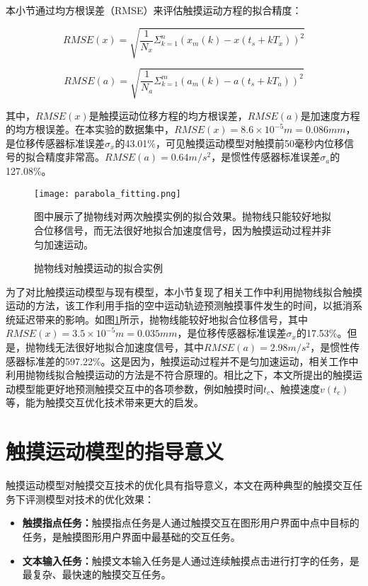 本小节通过均方根误差（RMSE）来评估触摸运动方程的拟合精度：

\begin{equation}
	RMSE(x)
	=\sqrt{\frac{1}{N_x}\Sigma^n_{k=1}{\left(x_m(k)-x(t_s+k T_x)\right)^2}}
\end{equation}

\begin{equation}
	RMSE(a)
	=\sqrt{\frac{1}{N_a}\Sigma^m_{k=1}{\left(a_m(k)-a(t_s+k T_a)\right)^2}}
\end{equation}

其中，$RMSE(x)$是触摸运动位移方程的均方根误差，$RMSE(a)$是加速度方程的均方根误差。在本实验的数据集中，$RMSE(x)=8.6\times10^{-5}m=0.086mm$，是位移传感器标准误差$\sigma_x$的43.01\%，可见触摸运动模型对触摸前50毫秒内位移信号的拟合精度非常高。$RMSE(a)=0.64m/s^2$，是惯性传感器标准误差$\sigma_a$的127.08\%。

\begin{figure}
	\centering
	\texttt{[image: parabola\_fitting.png]}
	\caption*{图中展示了抛物线对两次触摸实例的拟合效果。抛物线只能较好地拟合位移信号，而无法很好地拟合加速度信号，因为触摸运动过程并非匀加速运动。}
	\caption{抛物线对触摸运动的拟合实例}
	\label{fig:parabola_fitting}
\end{figure}

为了对比触摸运动模型与现有模型，本小节复现了相关工作中\cite{xia2014zero}利用抛物线拟合触摸运动的方法，该工作利用手指的空中运动轨迹预测触摸事件发生的时间，以抵消系统延迟带来的影响。如图\ref{fig:parabola_fitting}所示，抛物线能较好地拟合位移信号，其中$RMSE(x)=3.5\times10^{-5}m=0.035mm$，是位移传感器标准误差$\sigma_x$的17.53\%。但是，抛物线无法很好地拟合加速度信号，其中$RMSE(a)=2.98m/s^2$，是惯性传感器标准差的597.22\%。这是因为，触摸运动过程并不是匀加速运动，相关工作中利用抛物线拟合触摸运动的方法是不符合原理的。相比之下，本文所提出的触摸运动模型能更好地预测触摸交互中的各项参数，例如触摸时间$t_c$、触摸速度$v(t_c)$等，能为触摸交互优化技术带来更大的启发。

\section{触摸运动模型的指导意义}

触摸运动模型对触摸交互技术的优化具有指导意义，本文在两种典型的触摸交互任务下评测模型对技术的优化效果：

\begin{itemize}
\item \textbf{触摸指点任务：}触摸指点任务是人通过触摸交互在图形用户界面中点中目标的任务，是触摸图形用户界面中最基础的交互任务。
\item \textbf{文本输入任务：}触摸文本输入任务是人通过连续触摸点击进行打字的任务，是最复杂、最快速的触摸交互任务。
\end{itemize}

